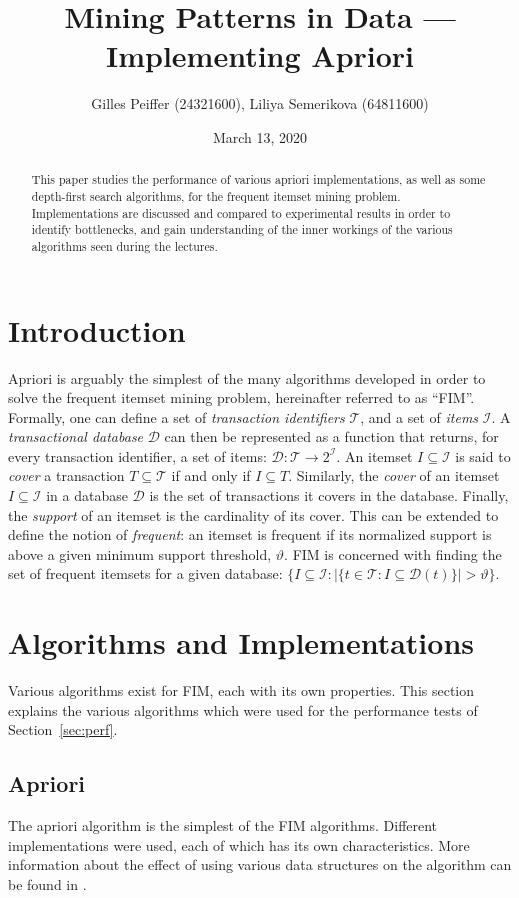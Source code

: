 \documentclass[journal, 9pt]{IEEEtran}
\title{Mining Patterns in Data --- Implementing Apriori}
\author{Gilles Peiffer (24321600), Liliya Semerikova (64811600)}
\date{March 13, 2020}
\theoremstyle{definition}
\renewcommand{\theta}{\vartheta}
\newcommand{\db}{\mathcal{D}}
\newcommand{\is}{\mathcal{I}}
\newcommand{\tr}{\mathcal{T}}
\newcommand{\abs}[1]{|#1|}
\begin{document}
\maketitle

\begin{abstract}
	This paper studies the performance of various apriori implementations, as well as some depth-first search algorithms, for the frequent itemset mining problem.
	Implementations are discussed and compared to experimental results in order to identify bottlenecks, and gain understanding of the inner workings of the various algorithms seen during the lectures.
\end{abstract}

\section*{Introduction}
Apriori is arguably the simplest of the many algorithms developed in order to solve the frequent itemset mining problem, hereinafter referred to as ``FIM''.
Formally, one can define a set of \emph{transaction identifiers} \(\tr\), and a set of \emph{items} \(\is\).
A \emph{transactional database} \(\db\) can then be represented as a function that returns, for every transaction identifier, a set of items: \(\db \colon \tr \to 2^\is\).
An itemset \(I \subseteq \is\) is said to \emph{cover} a transaction \(T \subseteq \tr\) if and only if \(I \subseteq T\).
Similarly, the \emph{cover} of an itemset \(I \subseteq \is\) in a database \(\db\) is the set of transactions it covers in the database.
Finally, the \emph{support} of an itemset is the cardinality of its cover.
This can be extended to define the notion of \emph{frequent}: an itemset is frequent if its normalized support is above a given minimum support threshold, \(\theta\).
FIM is concerned with finding the set of frequent itemsets for a given database: \(\{I \subseteq \is : \abs{\{t \in \tr: I \subseteq \db(t)\}} > \theta\}\).

\section{Algorithms and Implementations}
Various algorithms exist for FIM, each with its own properties.
This section explains the various algorithms which were used for the performance tests of Section~\ref{sec:perf}.

\subsection{Apriori}
The apriori algorithm is the simplest of the FIM algorithms.
Different implementations were used, each of which has its own characteristics.
More information about the effect of using various data structures on the algorithm can be found in \cite{apriori_bodon, apriori_prefix}.
\end{document}
